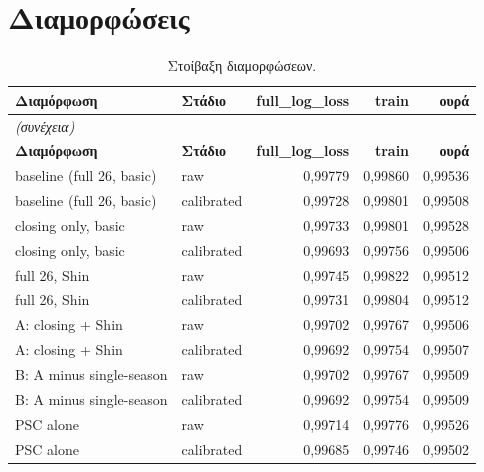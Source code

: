 \section{Διαμορφώσεις}
{\small
\begin{longtable}{@{}llrrr@{}}
\caption{Στοίβαξη διαμορφώσεων.}\label{app:cfg}\\
\toprule \textbf{Διαμόρφωση} & \textbf{Στάδιο} & \textbf{full\_log\_loss} & \textbf{train} & \textbf{ουρά} \\\midrule\endfirsthead
\multicolumn{5}{l}{\emph{(συνέχεια)}}\\\toprule \textbf{Διαμόρφωση} & \textbf{Στάδιο} & \textbf{full\_log\_loss} & \textbf{train} & \textbf{ουρά} \\\midrule\endhead
\bottomrule\endfoot
baseline (full 26, basic) & raw & 0,99779 & 0,99860 & 0,99536 \\
baseline (full 26, basic) & calibrated & 0,99728 & 0,99801 & 0,99508 \\
closing only, basic & raw & 0,99733 & 0,99801 & 0,99528 \\
closing only, basic & calibrated & 0,99693 & 0,99756 & 0,99506 \\
full 26, Shin & raw & 0,99745 & 0,99822 & 0,99512 \\
full 26, Shin & calibrated & 0,99731 & 0,99804 & 0,99512 \\
A: closing + Shin & raw & 0,99702 & 0,99767 & 0,99506 \\
A: closing + Shin & calibrated & 0,99692 & 0,99754 & 0,99507 \\
B: A minus single-season & raw & 0,99702 & 0,99767 & 0,99509 \\
B: A minus single-season & calibrated & 0,99692 & 0,99754 & 0,99509 \\
PSC alone & raw & 0,99714 & 0,99776 & 0,99526 \\
PSC alone & calibrated & 0,99685 & 0,99746 & 0,99502 \\
\end{longtable}
}

